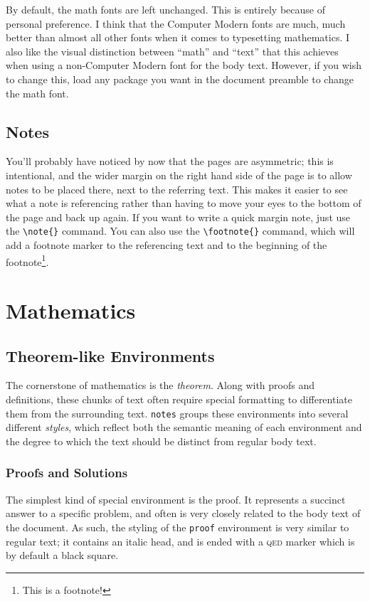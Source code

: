 \documentclass[diagram]{notes}
\begin{document}
By default, the math fonts are left unchanged. This is entirely because of personal preference. I think that the Computer Modern fonts are much, much better than almost all other fonts when it comes to typesetting mathematics. I also like the visual distinction between ``math'' and ``text'' that this achieves when using a non-Computer Modern font for the body text. However, if you wish to change this, load any package you want in the document preamble to change the math font.

\subsection{Notes}
You'll probably have noticed by now that the pages are asymmetric; this is intentional, and the wider margin on the right hand side of the page is to allow notes to be placed there, next to the referring text. This makes it easier to see what a note is referencing rather than having to move your eyes to the bottom of the page and back up again. If you want to write a quick margin note, just use the \verb|\note{}| command.  You can also use the \verb|\footnote{}| command, which will add a footnote marker to the referencing text and to the beginning of the footnote\footnote{This is a footnote!}.

\section{Mathematics}

\subsection{Theorem-like Environments}
The cornerstone of mathematics is the \emph{theorem}. Along with proofs and definitions, these chunks of text often require special formatting to differentiate them from the surrounding text. \texttt{notes} groups these environments into several different \emph{styles}, which reflect both the semantic meaning of each environment and the degree to which the text should be distinct from regular body text.

\subsubsection{Proofs and Solutions}
The simplest kind of special environment is the proof. It represents a succinct answer to a specific problem, and often is very closely related to the body text of the document. As such, the styling of the \texttt{proof} environment is very similar to regular text; it contains an italic head, and is ended with a \textsc{qed} marker which is by default a black square.
\end{document}
